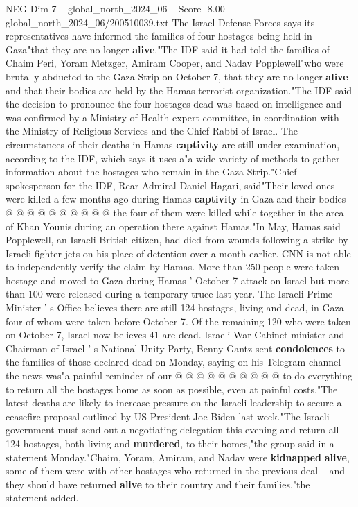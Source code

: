 \begin{textsample}{NEG Dim 7 – global\_north\_2024\_06 – Score -8.00 – global\_north\_2024\_06/200510039.txt}  \label{ex:f7_neg_132}
The Israel Defense Forces says its representatives have informed the families of four hostages being held in Gaza"that they are no longer \textbf{alive}."The IDF said it had told the families of Chaim Peri, Yoram Metzger, Amiram Cooper, and Nadav Popplewell"who were brutally abducted to the Gaza Strip on October 7, that they are no longer \textbf{alive} and that their bodies are held by the Hamas terrorist organization."The IDF said the decision to pronounce the four hostages dead was based on intelligence and was confirmed by a Ministry of Health expert committee, in coordination with the Ministry of Religious Services and the Chief Rabbi of Israel.
The circumstances of their deaths in Hamas \textbf{captivity} are still under examination, according to the IDF, which says it uses a"a wide variety of methods to gather information about the hostages who remain in the Gaza Strip."Chief spokesperson for the IDF, Rear Admiral Daniel Hagari, said"Their loved ones were killed a few months ago during Hamas \textbf{captivity} in Gaza and their bodies @ @ @ @ @ @ @ @ @ @ the four of them were killed while together in the area of Khan Younis during an operation there against Hamas."In May, Hamas said Popplewell, an Israeli-British citizen, had died from wounds following a strike by Israeli fighter jets on his place of detention over a month earlier.
CNN is not able to independently verify the claim by Hamas.
More than 250 people were taken hostage and moved to Gaza during Hamas ' October 7 attack on Israel but more than 100 were released during a temporary truce last year.
The Israeli Prime Minister ' s Office believes there are still 124 hostages, living and dead, in Gaza -- four of whom were taken before October 7.
Of the remaining 120 who were taken on October 7, Israel now believes 41 are dead.
Israeli War Cabinet minister and Chairman of Israel ' s National Unity Party, Benny Gantz sent \textbf{condolences} to the families of those declared dead on Monday, saying on his Telegram channel the news was"a painful reminder of our @ @ @ @ @ @ @ @ @ @ to do everything to return all the hostages home as soon as possible, even at painful costs."The latest deaths are likely to increase pressure on the Israeli leadership to secure a ceasefire proposal outlined by US President Joe Biden last week."The Israeli government must send out a negotiating delegation this evening and return all 124 hostages, both living and \textbf{murdered}, to their homes,"the group said in a statement Monday."Chaim, Yoram, Amiram, and Nadav were \textbf{kidnapped} \textbf{alive}, some of them were with other hostages who returned in the previous deal -- and they should have returned \textbf{alive} to their country and their families,"the statement added.

\end{textsample}
